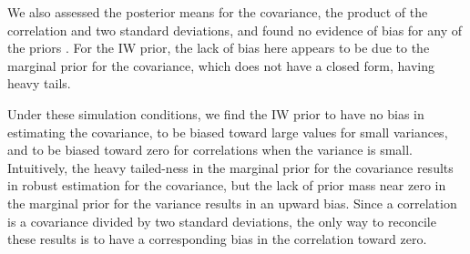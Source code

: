 \documentclass[12pt]{article}
\begin{document}

We also assessed the posterior means for the covariance, the product of the correlation and two standard deviations, and found no evidence of bias for any of the priors \citep{CCalvarez}. For the IW prior, the lack of bias here appears to be due to the marginal prior for the covariance, which does not have a closed form, having heavy tails. 

Under these simulation conditions, we find the IW prior to have no bias in estimating the covariance, to be biased toward large values for small variances, and to be biased toward zero for correlations when the variance is small. Intuitively, the heavy tailed-ness in the marginal prior for the covariance results in robust estimation for the covariance, but the lack of prior mass near zero in the marginal prior for the variance results in an upward bias. Since a correlation is a covariance divided by two standard deviations, the only way to reconcile these results is to have a corresponding bias in the correlation toward zero.
\end{document}
